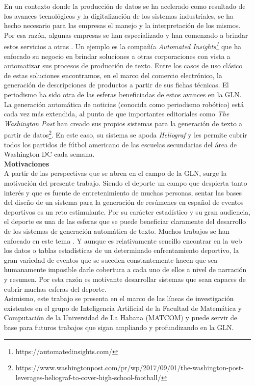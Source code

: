     En un contexto donde la producción de datos se ha acelerado como resultado de los avances tecnológicos y la digitalización de los sistemas industriales, se ha hecho necesario para 
las empresas el manejo y la interpretación de los mismos. Por esa raz\'on, algunas empresas se han especializado y han comenzado a brindar estos servicios a otras . 
Un ejemplo es la compañía \textit{Automated Insights\footnote[1]{https://automatedinsights.com/}} que ha enfocado su negocio en brindar soluciones a otras corporaciones con vista a automatizar sus 
procesos de producción de texto. Entre los casos de uso clásico de estas soluciones encontramos, en el marco del comercio electr\'onico, la generación de descripciones de 
productos a partir de sus fichas técnicas. El periodismo ha sido otra de las esferas beneficiadas de estos avances en la GLN. La generación automática de noticias (conocida como 
periodismo robótico) está cada vez más extendida, al punto de que importantes editoriales como \textit{The Washington Post} han creado sus propios sistemas para la generación de 
texto a partir de datos\footnote[2]{https://www.washingtonpost.com/pr/wp/2017/09/01/the-washington-post-leverages-heliograf-to-cover-high-school-football/}. 
En este caso, su sistema se apoda \textit{Heliograf} y les permite cubrir todos los partidos de fútbol americano de las escuelas secundarias del área de Washington DC 
cada semana.\\

    \textbf{Motivaciones}\\

    A partir de las perspectivas que se abren en el campo de la GLN, surge la motivación del presente trabajo. Siendo el deporte un campo 
que despierta tanto interés y que es fuente de entretenimiento de muchas personas, sentar las bases del diseño de un sistema para la generación de resúmenes en español de 
eventos deportivos es un reto estimulante. Por su carácter estadístico y su gran audiencia, el deporte es una de las esferas que se puede beneficiar claramente del desarrollo de los sistemas 
de generación automática de texto. Muchos trabajos se han enfocado en este tema . Y aunque es relativamente sencillo encontrar en la web 
los datos o tablas estadísticas de un determinado enfrentamiento deportivo, la gran variedad de eventos que se suceden constantemente hacen 
que sea humanamente imposible darle cobertura a cada uno de ellos a nivel de narración y resumen. Por esta razón es motivante desarrollar  sistemas que sean capaces de cubrir muchas esferas del deporte.\\
Asimismo, este trabajo se presenta en el marco de las líneas de investigación existentes en el grupo de Inteligencia Artificial de la Facultad de Matemática y Computación de la 
Universidad de La Habana (MATCOM) y puede servir de base para futuros trabajos que sigan ampliando y profundizando en la GLN.\\


